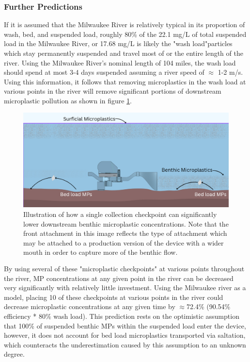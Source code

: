 \documentclass[fleqn,10pt]{SelfArx} %
\begin{document}
	\subsubsection{Further Predictions}	
	If it is assumed that the Milwaukee River is relatively typical in its proportion of wash, bed, and suspended load, roughly 80\% of the 22.1 mg/L of total suspended load in the Milwaukee River, or 17.68 mg/L is likely the "wash load"\textemdash particles which stay permanently suspended and travel most of or the entire length of the river. Using the Milwaukee River's nominal length of 104 miles, the wash load should spend at most 3-4 days suspended assuming a river speed of $\approx$ 1-2 m/s. 
	\linebreak
	Using this information, it follows that removing microplastics in the wash load at various points in the river will remove significant portions of downstream microplastic pollution as shown in figure \ref{fig:washload}.
	\begin{figure}[h]
		\centering
		\includegraphics[width=1\linewidth]{Figures/WashLoadCollection}
		\caption[Wash Load MP Collection]{Illustration of how a single collection checkpoint can significantly lower downstream \gls{benthic} microplastic concentrations. Note that the front attachment in this image reflects the type of attachment which may be attached to a production version of the device with a wider mouth in order to capture more of the \gls{benthic} flow.}
		\label{fig:washload}
	\end{figure}
	By using several of these "microplastic checkpoints" at various points throughout the river, MP concentrations at any given point in the river can be decreased very significantly with relatively little investment. Using the Milwaukee river as a model, placing 10 of these checkpoints at various points in the river could decrease microplastic concentrations at any given time by $\approx$72.4\% (90.54\% efficiency * 80\% wash load). This prediction rests on the optimistic assumption that 100\% of suspended \gls{benthic} MPs within the suspended load enter the device, however, it does not account for bed load microplastics transported via \gls{saltation}, which counteracts the underestimation caused by this assumption to an unknown degree.
	
\end{document}
